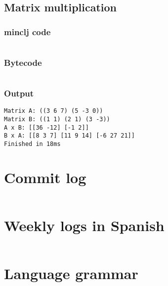 \documentclass[11pt]{scrreprt}
\begin{document}
\section{Matrix multiplication}
\subsection{minclj code}
\inputminted{clojure}{/home/mario/git/MarioJim/miniclj/examples/matrix_multiplication.clj}

\subsection{Bytecode}
\inputminted{text}{/home/mario/git/MarioJim/miniclj/examples/matrix_multiplication.mclj}

\subsection{Output}
\begin{verbatim}
Matrix A: ((3 6 7) (5 -3 0))
Matrix B: ((1 1) (2 1) (3 -3))
A x B: [[36 -12] [-1 2]]
B x A: [[8 3 7] [11 9 14] [-6 27 21]]
Finished in 18ms
\end{verbatim}


\appendix

\chapter{Commit log}
\label{apdx:commits}
\inputminted{text}{/home/mario/git/MarioJim/miniclj/docs/commits.txt}

\chapter{Weekly logs in Spanish}
\label{apdx:weeklylogs}
\inputminted[breaklines=true]{md}{/home/mario/git/MarioJim/miniclj/docs/logs.md}

\chapter{Language grammar}
\label{apdx:grammar}
\inputminted{rust}{/home/mario/git/MarioJim/miniclj/miniclj-lib/src/lispparser.lalrpop}
\end{document}
